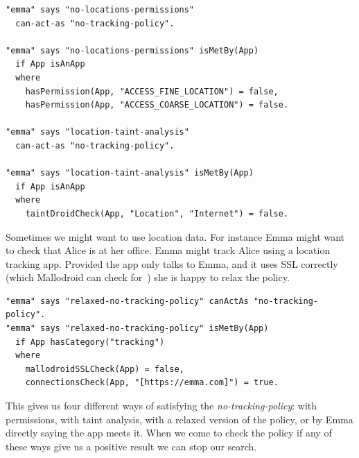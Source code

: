 \documentclass[]{llncs}
\begin{document}
\begin{lstlisting}
"emma" says "no-locations-permissions"
  can-act-as "no-tracking-policy".

"emma" says "no-locations-permissions" isMetBy(App)
  if App isAnApp
  where
    hasPermission(App, "ACCESS_FINE_LOCATION") = false,
    hasPermission(App, "ACCESS_COARSE_LOCATION") = false.

"emma" says "location-taint-analysis"
  can-act-as "no-tracking-policy".

"emma" says "location-taint-analysis" isMetBy(App)
  if App isAnApp
  where
    taintDroidCheck(App, "Location", "Internet") = false.
\end{lstlisting}

Sometimes we might want to use location data.
For instance Emma might want to check that Alice is at her office.
Emma might track Alice using a location tracking app.
Provided the app only talks to Emma, and it uses SSL correctly (which Mallodroid can check for~\cite{Fahl:2012dj}) she is happy to relax the policy.

\begin{lstlisting}
"emma" says "relaxed-no-tracking-policy" canActAs "no-tracking-policy".
"emma" says "relaxed-no-tracking-policy" isMetBy(App)
  if App hasCategory("tracking")
  where
    mallodroidSSLCheck(App) = false,
    connectionsCheck(App, "[https://emma.com]") = true.
\end{lstlisting}

This gives us four different ways of satisfying the \emph{no-tracking-policy}:
  with permissions,
  with taint analysis,
  with a relaxed version of the policy,
  or by Emma directly saying the app meets it.
When we come to check the policy if any of these ways give us a positive result we can stop our search.
\end{document}
